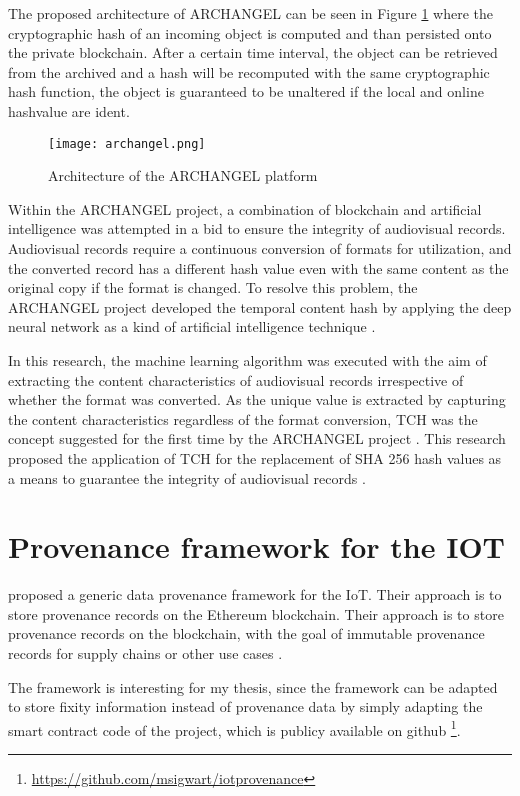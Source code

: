 The proposed architecture of ARCHANGEL can be seen in Figure \ref{fig:archangel} where the cryptographic hash of an incoming object is computed and than persisted onto the private blockchain. After a certain time interval, the object can be retrieved from the archived and a hash will be recomputed with the same cryptographic hash function, the object is guaranteed to be unaltered if the local and online hashvalue are ident.
\begin{figure}[h]
    \caption{Architecture of the ARCHANGEL platform \cite[2]{collomosse2018archangel}}
    \centering
    \texttt{[image: archangel.png]}\label{fig:archangel}
\end{figure}
Within the ARCHANGEL project, a combination of blockchain and artificial intelligence was attempted in a bid to ensure the integrity of audiovisual records. Audiovisual records require a continuous conversion of formats for utilization, and the converted record has a different hash value even with the same content as the original copy if the format is changed. To resolve this problem, the ARCHANGEL project developed the temporal content hash by applying the deep neural network as a kind of artificial intelligence technique \cite[3]{bui2019archangel}.

In this research, the machine learning algorithm was executed with the aim of extracting the content characteristics of audiovisual records irrespective of whether the format was converted. As the unique value is extracted by capturing the content characteristics regardless of the format conversion, TCH was the concept suggested for the first time by the ARCHANGEL project \cite[3]{bui2019archangel}. This research proposed the application of TCH for the replacement of SHA 256 hash values as a means to guarantee the integrity of audiovisual records \cite[4]{wang2021research}.
\section{Provenance framework for the IOT}
\cite{Sigwart2020} proposed a generic data provenance framework for the IoT. Their approach is to store provenance records on the Ethereum blockchain. Their approach is to store provenance records on the blockchain, with the goal of immutable provenance records for supply chains or other use cases \cite[4]{Sigwart2020}. 

The framework is interesting for my thesis, since the framework can be adapted to store fixity information instead of provenance data by simply adapting the smart contract code of the project, which is publicy available on github \footnote{\url{https://github.com/msigwart/iotprovenance}}.

